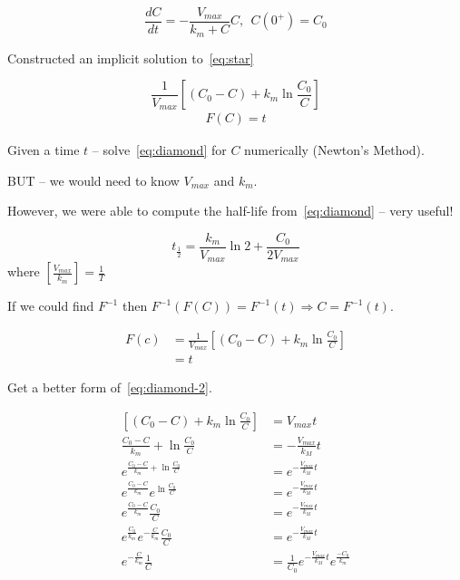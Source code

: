 \documentclass[
	date={October 30{,} 2024},
	month={10},
	day={30}
]{math486notes}
\begin{document}
\tableofcontents

\begin{equation}
	\frac{dC}{dt} = -\frac{V_{max}}{k_{m} + C}C,\ \ C(0^{+}) = C_{0}
	\label{eq:star}
\end{equation}

Constructed an implicit solution to~\eqref{eq:star}

\begin{equation}
	\frac{1}{V_{max}}\left[ (C_{0} - C) + k_{m} \ln\frac{C_{0}}{C} \right]
	\label{eq:diamond}
\end{equation}
\begin{equation*}
\begin{aligned}
	F(C) = t
\end{aligned}
\end{equation*}

Given a time $t$ -- solve~\eqref{eq:diamond} for $C$ numerically (Newton's Method).

BUT -- we would need to know $V_{max}$ and $k_{m}$.

However, we were able to compute the half-life from~\eqref{eq:diamond} -- very useful!

\[ t_{\frac{1}{2}} = \frac{k_{m}}{V_{max}} \ln 2 + \frac{C_{0}}{2V_{max}} \]
where $\left[ \frac{V_{max}}{k_{m}} \right] = \frac{1}{T}$

If we could find $F^{-1}$ then $F^{-1}(F(C)) = F^{-1}(t) \Rightarrow C = F^{-1}(t)$.

\begin{equation}
	\begin{aligned}
		F(c) &= \frac{1}{V_{max}} \left[ (C_{0} - C) + k_{m} \ln \frac{C_{0}}C\right]\\
		&= t
	\end{aligned}
	\label{eq:diamond-2}
\end{equation}

Get a better form of~\eqref{eq:diamond-2}.

\begin{equation*}
\begin{aligned}
	\left[ (C_{0} - C) + k_{m} \ln \frac{C_{0}}{C}\right] &= V_{max}t\\
	\frac{C_{0} - C}{k_{m}} + \ln \frac{C_{0}}{C} &= -\frac{V_{max}}{k_{M}}t\\
	e^{\frac{C_{0} - C}{k_{m}} + \ln \frac{C_{0}}{C}} &= e^{-\frac{V_{max}}{k_{M}}t}\\
	e^{\frac{C_{0} - C}{k_{m}}}e^{\ln \frac{C_{0}}{C}} &= e^{-\frac{V_{max}}{k_{M}}t}\\
	e^{\frac{C_{0} - C}{k_{m}}} \frac{C_{0}}{C} &= e^{-\frac{V_{max}}{k_{M}}t}\\
	e^{\frac{C_{0}}{k_{m}}} e^{-\frac{C}{k_{m}}} \frac{C_{0}}{C} &= e^{-\frac{V_{max}}{k_{M}}t}\\
	e^{-\frac{C}{k_{m}}} \frac{1}{C} &= \frac{1}{C_{0}}e^{-\frac{V_{max}}{k_{M}}t}e^{\frac{-C_{0}}{k_{m}}}\\
\end{aligned}
\end{equation*}
\end{document}
